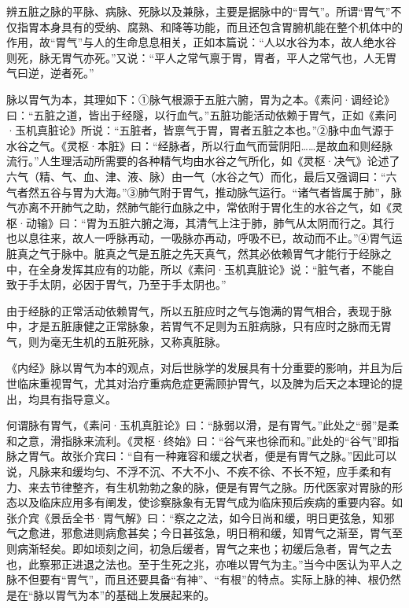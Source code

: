 \documentclass[12pt]{ctexbook}
\begin{document}


辨五脏之脉的平脉、病脉、死脉以及兼脉，主要是据脉中的“胃气”。所谓“胃气”不仅指胃本身具有的受纳、腐熟、和降等功能，而且还包含胃腑机能在整个机体中的作用，故“胃气”与人的生命息息相关，正如本篇说：“人以水谷为本，故人绝水谷则死，脉无胃气亦死。”又说：“平人之常气禀于胃，胃者，平人之常气也，人无胃气曰逆，逆者死。”

脉以胃气为本，其理如下：①脉气根源于五脏六腑，胃为之本。《素问·调经论》曰：“五脏之道，皆出于经隧，以行血气。”五脏功能活动依赖于胃气，正如《素问·玉机真脏论》所说：“五脏者，皆禀气于胃，胃者五脏之本也。”②脉中血气源于水谷之气。《灵枢·本脏》曰：“经脉者，所以行血气而营阴阳……是故血和则经脉流行。”人生理活动所需要的各种精气均由水谷之气所化，如《灵枢·决气》论述了六气（精、气、血、津、液、脉）由一气（水谷之气）而化，最后又强调曰：“六气者然五谷与胃为大海。”③肺气附于胃气，推动脉气运行。“诸气者皆属于肺”，脉气亦离不开肺气之助，然肺气能行血脉之中，常依附于胃化生的水谷之气，如《灵枢·动输》曰：“胃为五脏六腑之海，其清气上注于肺，肺气从太阴而行之。其行也以息往来，故人一呼脉再动，一吸脉亦再动，呼吸不已，故动而不止。”④胃气运脏真之气于脉中。脏真之气是五脏之先天真气，然其必依赖胃气才能行于经脉之中，在全身发挥其应有的功能，所以《素问·玉机真脏论》说：“脏气者，不能自致于手太阴，必因于胃气，乃至于手太阴也。”

由于经脉的正常活动依赖胃气，所以五脏应时之气与饱满的胃气相合，表现于脉中，才是五脏康健之正常脉象，若胃气不足则为五脏病脉，只有应时之脉而无胃气，则为毫无生机的五脏死脉，又称真脏脉。



《内经》脉以胃气为本的观点，对后世脉学的发展具有十分重要的影响，并且为后世临床重视胃气，尤其对治疗重病危症更需顾护胃气，以及脾为后天之本理论的提出，均具有指导意义。

何谓脉有胃气，《素问·玉机真脏论》曰：“脉弱以滑，是有胃气。”此处之“弱”是柔和之意，滑指脉来流利。《灵枢·终始》曰：“谷气来也徐而和。”此处的“谷气”即指脉之胃气。故张介宾曰：“自有一种雍容和缓之状者，便是有胃气之脉。”因此可以说，凡脉来和缓均匀、不浮不沉、不大不小、不疾不徐、不长不短，应手柔和有力、来去节律整齐，有生机勃勃之象的脉，便是有胃气之脉。历代医家对胃脉的形态以及临床应用多有阐发，使诊察脉象有无胃气成为临床预后疾病的重要内容。如张介宾《景岳全书·胃气解》曰：“察之之法，如今日尚和缓，明日更弦急，知邪气之愈进，邪愈进则病愈甚矣；今日甚弦急，明日稍和缓，知胃气之渐至，胃气至则病渐轻矣。即如顷刻之间，初急后缓者，胃气之来也；初缓后急者，胃气之去也，此察邪正进退之法也。至于生死之兆，亦唯以胃气为主。”当今中医认为平人之脉不但要有“胃气”，而且还要具备“有神”、“有根”的特点。实际上脉的神、根仍然是在“脉以胃气为本”的基础上发展起来的。
\end{document}
